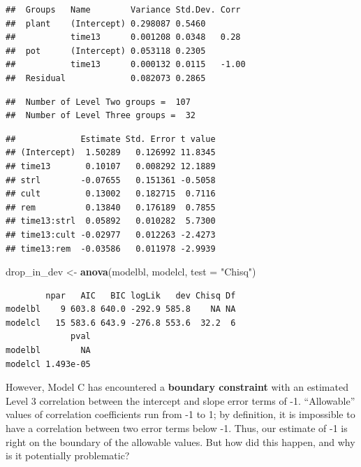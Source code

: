 \documentclass[
]{krantz}
\newenvironment{Shaded}{\begin{snugshade}}{\end{snugshade}}
\newcommand{\DataTypeTok}[1]{\textcolor[rgb]{0.27,0.27,0.27}{#1}}
\newcommand{\KeywordTok}[1]{\textcolor[rgb]{0.27,0.27,0.27}{\textbf{#1}}}
\newcommand{\NormalTok}[1]{#1}
\newcommand{\StringTok}[1]{\textcolor[rgb]{0.5,0.5,0.5}{#1}}
\begin{document}
\begin{verbatim}
##  Groups   Name        Variance Std.Dev. Corr 
##  plant    (Intercept) 0.298087 0.5460        
##           time13      0.001208 0.0348   0.28 
##  pot      (Intercept) 0.053118 0.2305        
##           time13      0.000132 0.0115   -1.00
##  Residual             0.082073 0.2865
\end{verbatim}

\begin{verbatim}
##  Number of Level Two groups =  107 
##  Number of Level Three groups =  32
\end{verbatim}

\begin{verbatim}
##             Estimate Std. Error t value
## (Intercept)  1.50289   0.126992 11.8345
## time13       0.10107   0.008292 12.1889
## strl        -0.07655   0.151361 -0.5058
## cult         0.13002   0.182715  0.7116
## rem          0.13840   0.176189  0.7855
## time13:strl  0.05892   0.010282  5.7300
## time13:cult -0.02977   0.012263 -2.4273
## time13:rem  -0.03586   0.011978 -2.9939
\end{verbatim}

\begin{Shaded}
\begin{Highlighting}[]
\NormalTok{drop_in_dev <-}\StringTok{ }\KeywordTok{anova}\NormalTok{(modelbl, modelcl, }\DataTypeTok{test =} \StringTok{"Chisq"}\NormalTok{)}
\end{Highlighting}
\end{Shaded}

\begin{verbatim}
        npar   AIC   BIC logLik   dev Chisq Df
modelbl    9 603.8 640.0 -292.9 585.8    NA NA
modelcl   15 583.6 643.9 -276.8 553.6  32.2  6
             pval
modelbl        NA
modelcl 1.493e-05
\end{verbatim}

However, Model C has encountered a \textbf{boundary constraint}  with an estimated Level 3 correlation between the intercept and slope error terms of -1. ``Allowable'' values of correlation coefficients run from -1 to 1; by definition, it is impossible to have a correlation between two error terms below -1. Thus, our estimate of -1 is right on the boundary of the allowable values. But how did this happen, and why is it potentially problematic?
\end{document}
